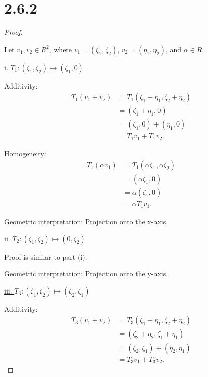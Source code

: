 \documentclass{article}
\begin{document}
\section*{2.6.2}
\begin{proof}
  $ $

  Let $v_1, v_2 \in R^2$, where $v_1 = (\zeta_1, \zeta_2)$, $v_2 = (\eta_1, \eta_2)$, and $\alpha \in R$.
  \newline

  \underline{i. $T_1: (\zeta_1, \zeta_2) \longmapsto (\zeta_1, 0)$}
  \newline

  Additivity:
  \begin{align*}
    T_1 (v_1 + v_2) 
    &= T_1 (\zeta_1 + \eta_1, \zeta_2 + \eta_2) \\
    &= (\zeta_1 + \eta_1, 0) \\
    &= (\zeta_1, 0) + (\eta_1, 0) \\
    &= T_1 v_1 + T_1 v_2.
  \end{align*}

  Homogeneity:
  \begin{align*}
    T_1 (\alpha v_1) 
    &= T_1 (\alpha \zeta_1, \alpha \zeta_2) \\
    &= (\alpha \zeta_1, 0) \\
    &= \alpha (\zeta_1, 0) \\
    &= \alpha T_1 v_1.
  \end{align*}

  Geometric interpretation: Projection onto the x-axis.
  \newline

  \underline{ii. $T_2: (\zeta_1, \zeta_2) \longmapsto (0, \zeta_2)$}
  \newline

  Proof is similar to part (i).
  \newline

  Geometric interpretation: Projection onto the y-axis.
  \newline

  \underline{iii. $T_3: (\zeta_1, \zeta_2) \longmapsto (\zeta_2, \zeta_1)$}
  \newline

  Additivity:
  \begin{align*}
    T_3(v_1 + v_2) 
    &= T_3 (\zeta_1 + \eta_1, \zeta_2 + \eta_2) \\
    &= (\zeta_2 + \eta_2, \zeta_1 + \eta_1) \\
    &= (\zeta_2, \zeta_1)
    +
    (\eta_2, \eta_1) \\
    &= T_3 v_1 + T_3 v_2.
  \end{align*}


\end{proof}
\end{document}
